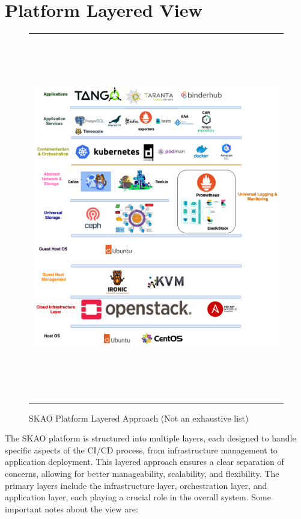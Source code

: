 \documentclass[a4paper]{spie}  %
\begin{document}
\section{Platform Layered View}

   \begin{figure} [ht]
   \begin{center}
   \begin{tabular}{c} %
   \includegraphics[height=16cm]{layers.png}
   \end{tabular}
   \end{center}
   \caption 
   { \label{fig:platform}
SKAO Platform Layered Approach (Not an exhaustive list) }
    \end{figure} 
    
The SKAO platform is structured into multiple layers, each designed to handle specific aspects of the CI/CD process, from infrastructure management to application deployment. This layered approach ensures a clear separation of concerns, allowing for better manageability, scalability, and flexibility. The primary layers include the infrastructure layer, orchestration layer, and application layer, each playing a crucial role in the overall system. Some important notes about the view are:
\end{document}

